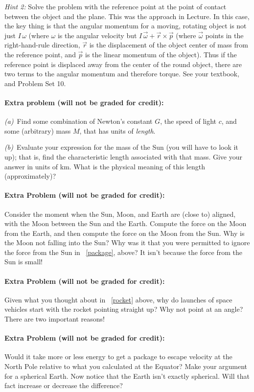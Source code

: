 \documentclass[12pt]{article}
\begin{document}
\emph{Hint 2:} Solve the problem with the reference point at the point of contact between
the object and the plane. This was the approach in Lecture.
In this case, the key thing is that the angular momentum for a moving, rotating
object is not just $I\,\omega$ (where $\omega$ is the angular velocity but $I\,\vec{\omega} + \vec{r}\times\vec{p}$
(where $\vec{\omega}$ points in the right-hand-rule direction, $\vec{r}$ is the displacement of the object
center of mass from the reference point, and $\vec{p}$ is the linear momentum of the object).
Thus if the reference point is displaced away from the center of the round object, there are two terms
to the angular momentum and therefore torque. See your textbook, and Problem Set 10.

\paragraph{Extra problem (will not be graded for credit):}%
\textsl{(a)}~Find some combination of Newton's constant $G$, the speed of light $c$, and
some (arbitrary) mass $M$, that has units of \emph{length}.

\textsl{(b)}~Evaluate your expression for the mass of the Sun (you
will have to look it up); that is, find the characteristic length
associated with that mass.  Give your answer in units of km.  What is
the physical meaning of this length (approximately)?

\paragraph{Extra Problem (will not be graded for credit):}%
Consider the moment when the Sun, Moon, and Earth are (close to)
aligned, with the Moon between the Sun and the Earth. Compute the
force on the Moon from the Earth, and then compute the force on the
Moon from the Sun. Why is the Moon not falling into the Sun? Why was
it that you were permitted to ignore the force from the
Sun in \problemname~\ref{package}, above? It isn't because the force
from the Sun is small!

\paragraph{Extra Problem (will not be graded for credit):}%
Given what you thought about in \problemname~\ref{rocket} above, why do launches
of space vehicles start with the rocket pointing straight up? Why not
point at an angle? There are two important reasons!

\paragraph{Extra Problem (will not be graded for credit):}%
Would it take more or less energy to get a package to escape velocity
at the North Pole relative to what you calculated at the Equator? Make
your argument for a spherical Earth. Now notice that the Earth isn't
exactly spherical. Will that fact increase or decrease the difference?
\end{document}
